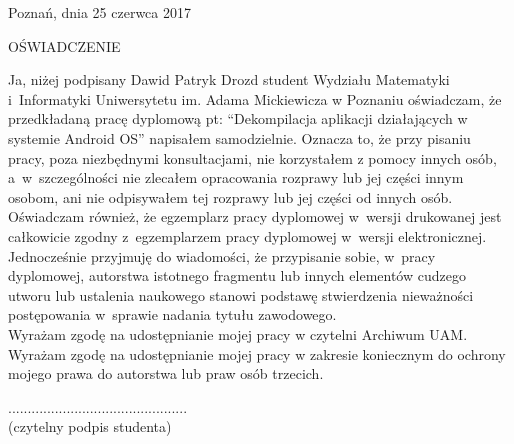 \documentclass[12pt,a4paper,leqno,oneside,titlepage]{book}
\newcommand{\myAuthorName}{Dawid Patryk Drozd}
\begin{document}
\begin{flushright}{
Poznań, dnia 25 czerwca 2017
}\end{flushright}
\begin{center}{
\par
\vspace{1.5cm plus 1.5fill}
{\large OŚWIADCZENIE}
}\end{center}
\par
\vspace{1.5cm plus 1.5fill}
Ja, niżej podpisany \myAuthorName{} student Wydziału Matematyki i~Informatyki Uniwersytetu im. Adama Mickiewicza w Poznaniu oświadczam, że przedkładaną pracę dyplomową pt: ``Dekompilacja aplikacji działających w systemie Android OS'' napisałem samodzielnie. Oznacza to, że przy pisaniu pracy, poza niezbędnymi konsultacjami, nie korzystałem z pomocy innych osób, a~w~szczególności nie zlecałem opracowania rozprawy lub jej części innym osobom, ani nie odpisywałem tej rozprawy lub jej części od innych osób.\\

Oświadczam również, że egzemplarz pracy dyplomowej w~wersji drukowanej jest całkowicie zgodny z~egzemplarzem pracy dyplomowej w~wersji elektronicznej.\\

Jednocześnie przyjmuję do wiadomości, że przypisanie sobie, w~pracy dyplomowej, autorstwa istotnego fragmentu lub innych elementów cudzego utworu lub ustalenia naukowego stanowi podstawę  stwierdzenia  nieważności postępowania w~sprawie nadania tytułu zawodowego.\\

Wyrażam zgodę na udostępnianie mojej pracy w czytelni Archiwum UAM.\\

Wyrażam zgodę na udostępnianie mojej pracy w zakresie koniecznym do ochrony mojego prawa do autorstwa lub praw osób trzecich.
\par
\vspace{1.5cm plus 1.5fill}
\begin{center}{
..............................................\\
{\footnotesize(czytelny podpis studenta)}
}\end{center}


\end{document}
